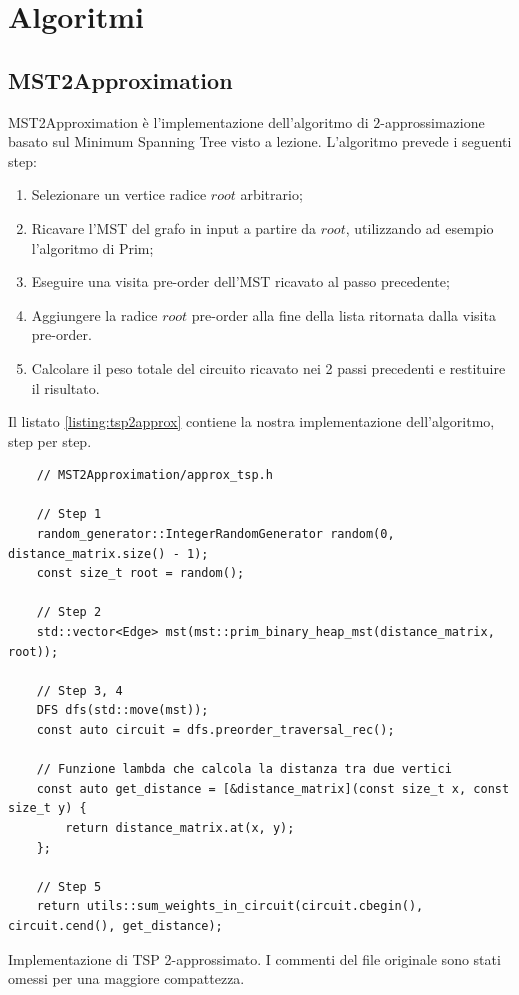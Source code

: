 
\section{Algoritmi}
\label{cap:algorithms}

\subsection{MST2Approximation}

MST2Approximation è l'implementazione dell'algoritmo di $2$-approssimazione basato sul Minimum Spanning Tree visto a lezione. L'algoritmo prevede i seguenti step:

\begin{enumerate}
    \item Selezionare un vertice radice $root$ arbitrario;
    \item Ricavare l'MST del grafo in input a partire da $root$, utilizzando ad esempio l'algoritmo di Prim;
    \item Eseguire una visita pre-order dell'MST ricavato al passo precedente;
    \item Aggiungere la radice $root$ pre-order alla fine della lista ritornata dalla visita pre-order.
    \item Calcolare il peso totale del circuito ricavato nei 2 passi precedenti e restituire il risultato.
\end{enumerate}

\noindent Il listato \ref{listing:tsp2approx} contiene la nostra implementazione dell'algoritmo, step per step.\\

\begin{listing}[!ht]
\begin{verbatim}
    // MST2Approximation/approx_tsp.h

    // Step 1
    random_generator::IntegerRandomGenerator random(0, distance_matrix.size() - 1);
    const size_t root = random();

    // Step 2
    std::vector<Edge> mst(mst::prim_binary_heap_mst(distance_matrix, root));

    // Step 3, 4
    DFS dfs(std::move(mst));
    const auto circuit = dfs.preorder_traversal_rec();

    // Funzione lambda che calcola la distanza tra due vertici
    const auto get_distance = [&distance_matrix](const size_t x, const size_t y) {
        return distance_matrix.at(x, y);
    };

    // Step 5
    return utils::sum_weights_in_circuit(circuit.cbegin(), circuit.cend(), get_distance);
\end{verbatim}
\caption{Implementazione di TSP 2-approssimato. I commenti del file originale sono stati omessi per una maggiore compattezza.}
\label{listing:tsp2approx}
\end{listing}


